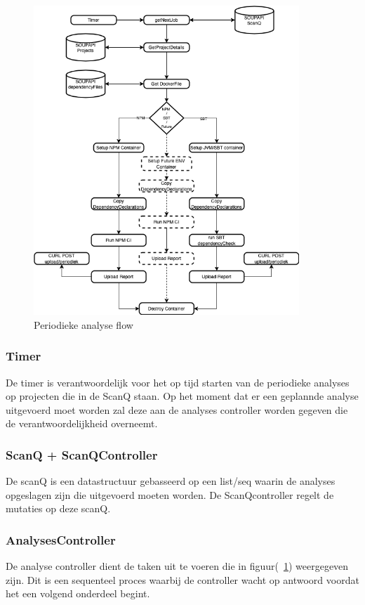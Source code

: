 \begin{figure}[bth]
    \myfloatalign
    \includegraphics[width=10cm]{gfx/SOUPAPI-Periodic Analysis}
    \caption{Periodieke analyse flow}
    \label{fig:PeriodicAnalysis}
\end{figure}

\subsubsection{Timer}
De timer is verantwoordelijk voor het op tijd starten van de periodieke analyses op projecten die in de ScanQ staan. Op het moment dat er een geplannde analyse uitgevoerd moet worden zal deze aan de analyses controller worden gegeven die de verantwoordelijkheid overneemt.
\subsubsection{ScanQ + ScanQController}
De scanQ is een datastructuur gebasseerd op een list/seq waarin de analyses opgeslagen zijn die uitgevoerd moeten worden. De ScanQcontroller regelt de mutaties op deze scanQ.
\subsubsection{AnalysesController}
De analyse controller dient de taken uit te voeren die in figuur(~\ref{fig:PeriodicAnalysis}) weergegeven zijn. Dit is een sequenteel proces waarbij de controller wacht op antwoord voordat het een volgend onderdeel begint.



